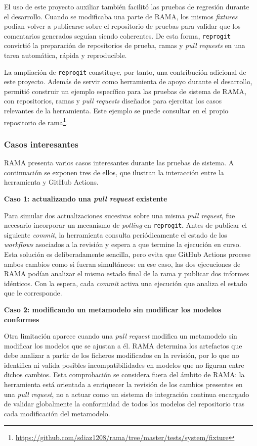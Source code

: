 \documentclass[11pt]{article}
\begin{document}
El uso de este proyecto auxiliar también facilitó las pruebas de regresión durante el desarrollo. Cuando se modificaba una parte de RAMA, los mismos \textit{fixtures} podían volver a publicarse sobre el repositorio de pruebas para validar que los comentarios generados seguían siendo coherentes. De esta forma, \texttt{reprogit} convirtió la preparación de repositorios de prueba, ramas y \textit{pull requests} en una tarea automática, rápida y reproducible.

La ampliación de \texttt{reprogit} constituye, por tanto, una contribución adicional de este proyecto. Además de servir como herramienta de apoyo durante el desarrollo, permitió construir un ejemplo específico para las pruebas de sistema de RAMA, con repositorios, ramas y \textit{pull requests} diseñados para ejercitar los casos relevantes de la herramienta. Este ejemplo se puede consultar en el propio repositorio de rama\footnote{\url{https://github.com/sdiaz1208/rama/tree/master/tests/system/fixture}}.

\subsubsection{Casos interesantes}

RAMA presenta varios casos interesantes durante las pruebas de sistema. A continuación se exponen tres de ellos, que ilustran la interacción entre la herramienta y GitHub Actions.

\textbf{Caso 1: actualizando una \textit{pull request} existente}

Para simular dos actualizaciones sucesivas sobre una misma \textit{pull request}, fue necesario incorporar un mecanismo de \textit{polling} en \texttt{reprogit}. Antes de publicar el siguiente \textit{commit}, la herramienta consulta periódicamente el estado de los \textit{workflows} asociados a la revisión y espera a que termine la ejecución en curso. Esta solución es deliberadamente sencilla, pero evita que GitHub Actions procese ambos cambios como si fueran simultáneos: en ese caso, las dos ejecuciones de RAMA podían analizar el mismo estado final de la rama y publicar dos informes idénticos. Con la espera, cada \textit{commit} activa una ejecución que analiza el estado que le corresponde.

\textbf{Caso 2: modificando un metamodelo sin modificar los modelos conformes}

Otra limitación aparece cuando una \textit{pull request} modifica un metamodelo sin modificar los modelos que se ajustan a él. RAMA determina los artefactos que debe analizar a partir de los ficheros modificados en la revisión, por lo que no identifica ni valida posibles incompatibilidades en modelos que no figuran entre dichos cambios. Esta comprobación se considera fuera del ámbito de RAMA: la herramienta está orientada a enriquecer la revisión de los cambios presentes en una \textit{pull request}, no a actuar como un sistema de integración continua encargado de validar globalmente la conformidad de todos los modelos del repositorio tras cada modificación del metamodelo.
\end{document}
